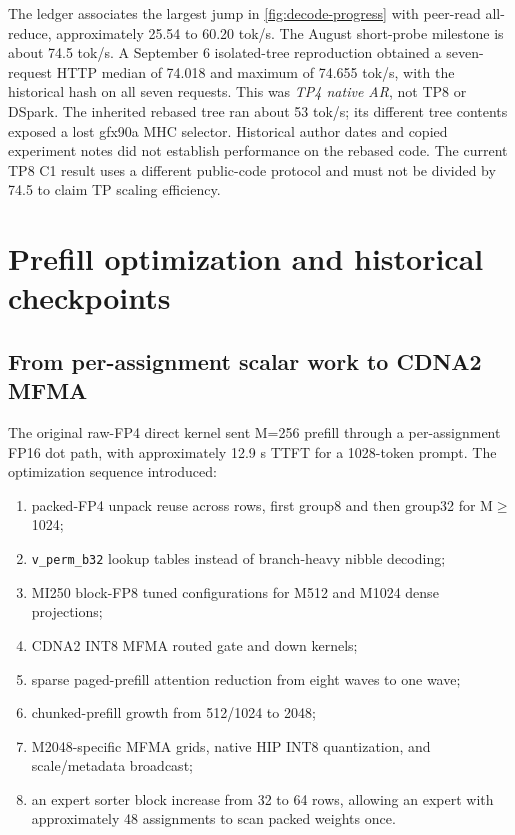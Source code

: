 \documentclass[sigplan,10pt]{acmart}
\begin{document}
The ledger associates the largest jump in \cref{fig:decode-progress} with peer-read all-reduce, approximately 25.54 to 60.20 tok/s. The August short-probe milestone is about 74.5 tok/s. A September 6 isolated-tree reproduction obtained a seven-request HTTP median of 74.018 and maximum of 74.655 tok/s, with the historical hash on all seven requests. This was \emph{TP4 native AR}, not TP8 or DSpark. The inherited rebased tree ran about 53 tok/s; its different tree contents exposed a lost gfx90a MHC selector. Historical author dates and copied experiment notes did not establish performance on the rebased code. The current TP8 C1 result uses a different public-code protocol and must not be divided by 74.5 to claim TP scaling efficiency.

\section{Prefill optimization and historical checkpoints}

\subsection{From per-assignment scalar work to CDNA2 MFMA}

The original raw-FP4 direct kernel sent M=256 prefill through a per-assignment FP16 dot path, with approximately 12.9 s TTFT for a 1028-token prompt. The optimization sequence introduced:

\begin{enumerate}
  \item packed-FP4 unpack reuse across rows, first group8 and then group32 for M$\geq$1024;
  \item \texttt{v\_perm\_b32} lookup tables instead of branch-heavy nibble decoding;
  \item MI250 block-FP8 tuned configurations for M512 and M1024 dense projections;
  \item CDNA2 INT8 MFMA routed gate and down kernels;
  \item sparse paged-prefill attention reduction from eight waves to one wave;
  \item chunked-prefill growth from 512/1024 to 2048;
  \item M2048-specific MFMA grids, native HIP INT8 quantization, and scale/metadata broadcast;
  \item an expert sorter block increase from 32 to 64 rows, allowing an expert with approximately 48 assignments to scan packed weights once.
\end{enumerate}
\end{document}
